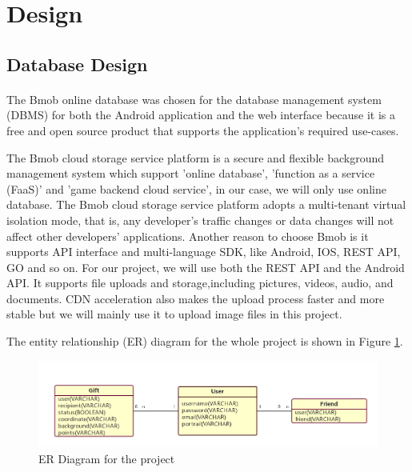 \section{Design}
\label{sec:Design}

\subsection{Database Design} 
\paragraph{}The Bmob online database was chosen for the database management system (DBMS) for both the Android application and the web interface because it is a free and open source product that supports the application's required use-cases. 
\par The Bmob cloud storage service platform is a secure and flexible background management system which support 'online database', 'function as a service (FaaS)' and 'game backend cloud service', in our case, we will only use online database. The Bmob cloud storage service platform adopts a multi-tenant virtual isolation mode, that is, any developer's traffic changes or data changes will not affect other developers' applications. 
Another reason to choose Bmob is it supports API interface and multi-language SDK, like Android, IOS, REST API, GO and so on. For our project, we will use both the REST API and the Android API. It supports file uploads and storage,including pictures, videos, audio, and documents. CDN acceleration also makes the upload process faster and more stable but we will mainly use it to upload image files in this project. 
\par The entity relationship (ER) diagram for the whole project is shown in Figure \ref{ERDiagram}.

\begin{figure}[htb]
\centering
\includegraphics[width=1\textwidth]{section03/assets/ERDiagram.png}
\caption[ER Diagram for the project]{\label{ERDiagram}ER Diagram for the project}
\end{figure}


